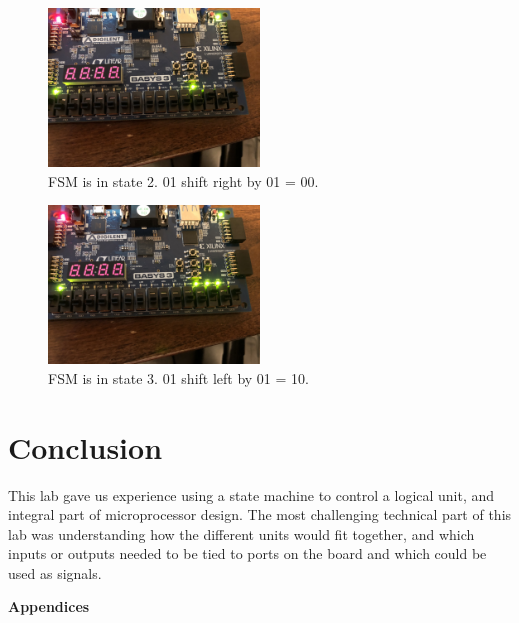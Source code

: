 \documentclass[11pt]{article}
\begin{document}
\begin{figure}[H]
\begin{center}
	\includegraphics[width=0.5\textwidth]{./images/p3/IMG_7881.jpg}
	\caption{\label{fig:int_res7}FSM is in state 2. 01 shift right by 01 = 00.}
\end{center}
\end{figure}

\begin{figure}[H]
\begin{center}
	\includegraphics[width=0.5\textwidth]{./images/p3/IMG_1796.jpg}
	\caption{\label{fig:int_res8}FSM is in state 3. 01 shift left by 01 = 10.}
\end{center}
\end{figure}

\section{Conclusion}
This lab gave us experience using a state machine to control a logical unit, and integral part of microprocessor design. The most challenging technical part of this lab was understanding how the different units would fit together, and which inputs or outputs needed to be tied to ports on the board and which could be used as signals.

\pagebreak

\textbf{Appendices}
\end{document}
